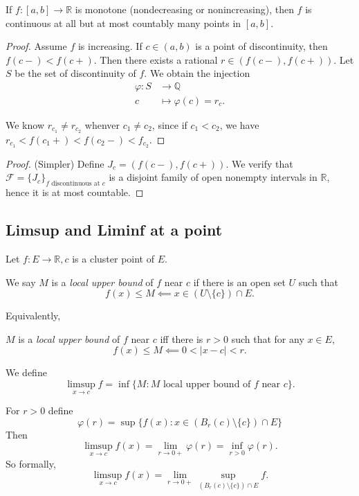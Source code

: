 \begin{theorem}
	If $f: [a,b] \to \mathbb{R}$ is monotone (nondecreasing or nonincreasing), then $f$ is continuous at all but at most countably many points in  $[a,b]$.
\end{theorem}
\begin{proof}
	Assume $f$ is increasing. If $c \in (a,b)$ is a point of discontinuity, then $f(c-) < f(c+)$. Then there exists a rational $r \in (f(c-), f(c+))$. Let $S$ be the set of discontinuity of $f$. We obtain the injection
	 \begin{align*}
		\varphi: S &\longrightarrow \mathbb{Q} \\
		c &\longmapsto \varphi(c) = r_c
	.\end{align*}

	We know $r_{c_1} \neq r_{c_2}$ whenver $c_1\neq c_2$, since if  $c_1<c_2$, we have $r_{c_1}<f(c_1+) < f(c_2-) < f_{c_2}$.
\end{proof}
\begin{proof}
	(Simpler) Define $J_c = (f(c-), f(c+))$. We verify that $\mathcal{F} = \{J_c\}_{f \text{ discontinuous at }c}$ is a disjoint family of open nonempty intervals in $\mathbb{R}$, hence it is at most countable.
\end{proof}

\subsection{Limsup and Liminf at a point}

Let $f: E \to \mathbb{R}, c$ is a cluster point of $E$.

\begin{definition}
	We say $M$ is a \textit{local upper bound} of $f$ near $c$ if there is an open set $U$ such that \[
		f(x) \le M \impliedby x \in \left( U \setminus \{c\}  \right) \cap E
	.\] 
\end{definition}
Equivalently,
\begin{proposition}
	$M$ is a \textit{local upper bound} of $f$ near $c$ iff there is $r>0$ such that for any $x \in E$,
	 \[
		f(x) \le M \impliedby 0 < |x-c| < r
	.\] 
\end{proposition}

\begin{definition}
	We define
	\[
		\limsup_{x \to c} f =
		\operatorname{inf} \{M: M \text{ local upper bound of $f$ near $c$}\}
	.\] 
\end{definition}
\begin{proposition}
	For $r>0$ define
	\[
		\varphi(r) = \operatorname{sup} \{f(x): x \in \left( B_r(c)\setminus \{c\} \right) \cap E \}
	\]
	Then 
	\[
		\limsup_{x \to c} f(x) = \lim_{r \to 0+} \varphi(r) = \operatorname{inf}_{r>0}\varphi(r)
	.\] 
	So formally,
	\[
		\limsup_{x \to c} f(x) = \lim_{r \to 0+} \operatorname{sup}_{\left( B_r(c) \setminus \{c\} \right) \cap E }f
	.\] 
\end{proposition}

